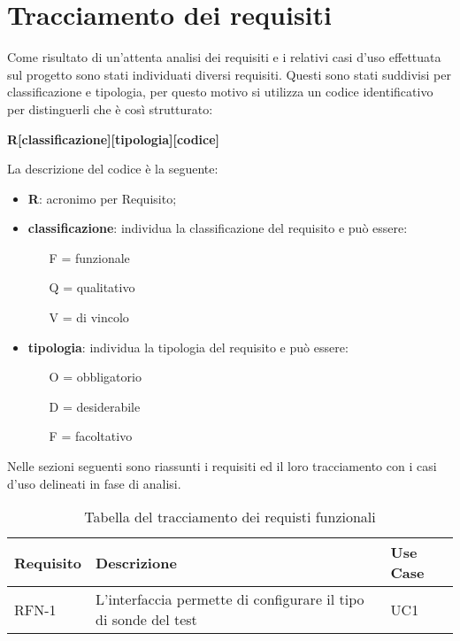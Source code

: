 \section{Tracciamento dei requisiti}

Come risultato di un'attenta analisi dei requisiti e i relativi casi d'uso effettuata sul progetto sono stati individuati diversi requisiti. Questi sono stati suddivisi per classificazione e tipologia, per questo motivo si utilizza un codice identificativo per distinguerli che è così strutturato:
\begin{center}
	\textbf{R[classificazione][tipologia][codice]}
\end{center}
La descrizione del codice è la seguente:
\begin{itemize}
	\item \textbf{R}: acronimo per Requisito;
	\item \textbf{classificazione}: individua la classificazione del requisito e può essere:
	\begin{itemize}
		\item [F =] funzionale
		\item [Q =] qualitativo
		\item [V =]  di vincolo
	\end{itemize}
	\item \textbf{tipologia}: individua la tipologia del requisito e può essere:
	\begin{itemize}
		\item [O =] obbligatorio
		\item [D =] desiderabile
		\item [F =] facoltativo
	\end{itemize}
\end{itemize}

Nelle sezioni seguenti sono riassunti i requisiti ed il loro tracciamento con i casi d'uso delineati in fase di analisi.

\begin{table}%
\caption{Tabella del tracciamento dei requisti funzionali}
\label{tab:requisiti-funzionali}
\begin{tabularx}{\textwidth}{lXl}
\hline\hline
\textbf{Requisito} & \textbf{Descrizione} & \textbf{Use Case}\\
\hline
RFN-1     & L'interfaccia permette di configurare il tipo di sonde del test & UC1 \\
\hline
\end{tabularx}
\end{table}%

